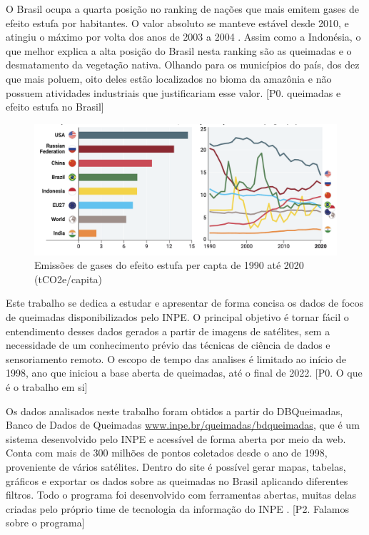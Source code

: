 \documentclass[cic,tc]{iiufrgs}
\begin{document}
O Brasil ocupa a quarta posição no ranking de nações que mais emitem gases de 
efeito estufa por habitantes. O valor absoluto se manteve estável desde 2010, e 
atingiu o máximo por volta dos anos de 2003 a 2004 \citep{unep2022}. Assim como a 
Indonésia, o que melhor explica a alta posição do Brasil nesta ranking são as 
queimadas e o desmatamento da vegetação nativa. Olhando para os municípios do país, 
dos dez que mais poluem, oito deles estão localizados no bioma da amazônia e não 
possuem atividades industriais que justificariam esse valor.
[P0. queimadas e efeito estufa no Brasil] \par

\begin{figure}
    \caption{Emissões de gases do efeito estufa per capta de 1990 até 2020 (tCO2e/capita)}
    \begin{center}
        \includegraphics[width=35em]{emissoes_gee_per_capta}
    \end{center}
    \label{fig:emissoes_gee_per_capta}
\end{figure}

Este trabalho se dedica a estudar e apresentar de forma concisa os dados de 
focos de queimadas disponibilizados pelo INPE. O principal objetivo é tornar 
fácil o entendimento desses dados gerados a partir de imagens de satélites, sem a 
necessidade de um conhecimento prévio das técnicas de ciência de dados e 
sensoriamento remoto. O escopo de tempo das analises é limitado ao início 
de 1998, ano que iniciou a base aberta de queimadas, até o final de 2022.  
[P0. O que é o trabalho em si] \par

Os dados analisados neste trabalho foram obtidos a partir do DBQueimadas, 
Banco de Dados de Queimadas \url{www.inpe.br/queimadas/bdqueimadas},
que é um sistema desenvolvido pelo INPE e acessível de forma aberta por meio da web. 
Conta com mais de 300 milhões de pontos coletados desde o ano de 1998, 
proveniente de vários satélites. Dentro do site é possível gerar mapas,
tabelas, gráficos e exportar os dados sobre as queimadas no Brasil 
aplicando diferentes filtros. Todo o programa foi desenvolvido com 
ferramentas abertas, muitas delas criadas pelo próprio time de tecnologia da 
informação do INPE \citep{setzer2019banco}. [P2. Falamos sobre o programa] \par
\end{document}
